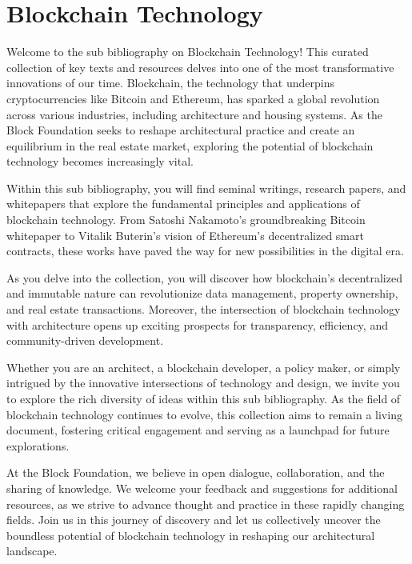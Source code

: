 \section{Blockchain Technology}


Welcome to the sub bibliography on Blockchain Technology! This curated collection of key texts and resources delves into one of the most transformative innovations of our time. Blockchain, the technology that underpins cryptocurrencies like Bitcoin and Ethereum, has sparked a global revolution across various industries, including architecture and housing systems. As the Block Foundation seeks to reshape architectural practice and create an equilibrium in the real estate market, exploring the potential of blockchain technology becomes increasingly vital.

Within this sub bibliography, you will find seminal writings, research papers, and whitepapers that explore the fundamental principles and applications of blockchain technology. From Satoshi Nakamoto's groundbreaking Bitcoin whitepaper to Vitalik Buterin's vision of Ethereum's decentralized smart contracts, these works have paved the way for new possibilities in the digital era.

As you delve into the collection, you will discover how blockchain's decentralized and immutable nature can revolutionize data management, property ownership, and real estate transactions. Moreover, the intersection of blockchain technology with architecture opens up exciting prospects for transparency, efficiency, and community-driven development.

Whether you are an architect, a blockchain developer, a policy maker, or simply intrigued by the innovative intersections of technology and design, we invite you to explore the rich diversity of ideas within this sub bibliography. As the field of blockchain technology continues to evolve, this collection aims to remain a living document, fostering critical engagement and serving as a launchpad for future explorations.

At the Block Foundation, we believe in open dialogue, collaboration, and the sharing of knowledge. We welcome your feedback and suggestions for additional resources, as we strive to advance thought and practice in these rapidly changing fields. Join us in this journey of discovery and let us collectively uncover the boundless potential of blockchain technology in reshaping our architectural landscape.





